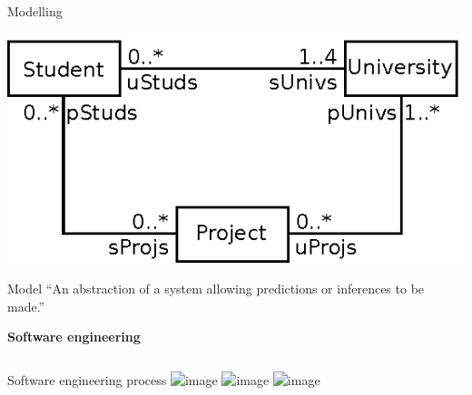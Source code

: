 \documentclass[dvips,slidetop,mathserif,brown]{beamer}
\begin{document}
\begin{frame}{Modelling}
  \begin{center}
    \includegraphics{ex_project_uml_class_3}
  \end{center}
\end{frame}

\begin{frame}{Model}
  ``An abstraction of a system allowing predictions or inferences to be made.''
\end{frame}

\begin{frame}{}
  \begin{center}
    \begin{Huge}
      \textbf{Software engineering}
    \end{Huge}
  \end{center}
\end{frame}

\begin{frame}{}
  \begin{columns}[T]
    \begin{block}{Software engineering process}
      \includegraphics<1>{process_se_1}
      \includegraphics<2>{process_se_2}
      \includegraphics<3>{process_se_3}
    \end{block}
  \end{columns}
\end{frame}

\end{document}
